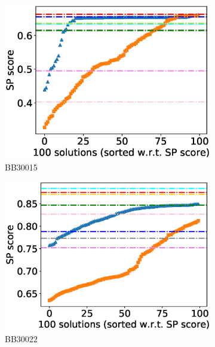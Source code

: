 \begin{figure}[!htbp]
\begin{adjustwidth}{-1cm}{-1cm}
		\begin{subfigure}{0.22\textwidth}
			\includegraphics[width=\columnwidth]{Figure/summary/precomputedInit/Balibase/BB30015_pairs_density_single_run_2}
			\caption{BB30015}
		\end{subfigure}
		\begin{subfigure}{0.22\textwidth}
			\includegraphics[width=\columnwidth]{Figure/summary/precomputedInit/Balibase/BB30022_pairs_density_single_run_2}
			\caption{BB30022}
		\end{subfigure}
		\begin{subfigure}{0.22\textwidth}

\end{subfigure}
\end{adjustwidth}
\end{figure}
